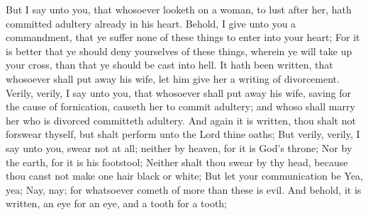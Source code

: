 But I say unto you, that whosoever looketh on a woman, to lust after her, hath committed adultery already in his heart.
\bverse \iffalse Behold, I give unto you a commandment, that ye suffer none of these things to enter into your heart; \fi
Behold, I give unto you a commandment, that ye suffer none of these things to enter into your heart;
\bverse \iffalse For it is better that ye should deny yourselves of these things, wherein ye will take up your cross, than that ye should be cast into hell. \fi
For it is better that ye should deny yourselves of these things, wherein ye will take up your cross, than that ye should be cast into hell.
\bverse \iffalse It hath been written, that whosoever shall put away his wife, let him give her a writing of divorcement. \fi
It hath been written, that whosoever shall put away his wife, let him give her a writing of divorcement.
\bverse \iffalse Verily, verily, I say unto you, that whosoever shall put away his wife, saving for the cause of fornication, causeth her to commit adultery; and whoso shall marry her who is divorced committeth adultery. \fi
Verily, verily, I say unto you, that whosoever shall put away his wife, saving for the cause of fornication, causeth her to commit adultery; and whoso shall marry her who is divorced committeth adultery.
\bverse \iffalse And again it is written, thou shalt not forswear thyself, but shalt perform unto the Lord thine oaths; \fi
And again it is written, thou shalt not forswear thyself, but shalt perform unto the Lord thine oaths;
\bverse \iffalse But verily, verily, I say unto you, swear not at all; neither by heaven, for it is God's throne; \fi
But verily, verily, I say unto you, swear not at all; neither by heaven, for it is God's throne;
\bverse \iffalse Nor by the earth, for it is his footstool; \fi
Nor by the earth, for it is his footstool;
\bverse \iffalse Neither shalt thou swear by thy head, because thou canst not make one hair black or white; \fi
Neither shalt thou swear by thy head, because thou canst not make one hair black or white;
\bverse \iffalse But let your communication be Yea, yea; Nay, nay; for whatsoever cometh of more than these is evil. \fi
But let your communication be Yea, yea; Nay, nay; for whatsoever cometh of more than these is evil.
\bverse \iffalse And behold, it is written, an eye for an eye, and a tooth for a tooth; \fi
And behold, it is written, an eye for an eye, and a tooth for a tooth;
